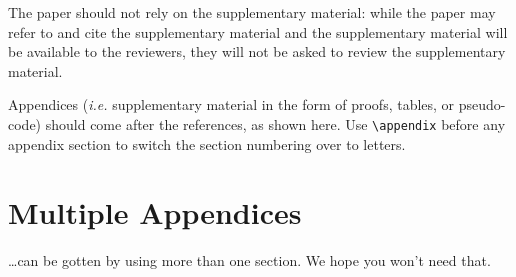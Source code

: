 \documentclass[11pt,a4paper]{article}
\begin{document}
The paper should not rely on the supplementary material: while the paper
may refer to and cite the supplementary material and the supplementary material will be available to the
reviewers, they will not be asked to review the
supplementary material.

Appendices ({\em i.e.} supplementary material in the form of proofs, tables,
or pseudo-code) should come after the references, as shown here. Use
\verb|\appendix| before any appendix section to switch the section
numbering over to letters.

\section{Multiple Appendices}
\dots can be gotten by using more than one section. We hope you won't
need that.
\end{document}
